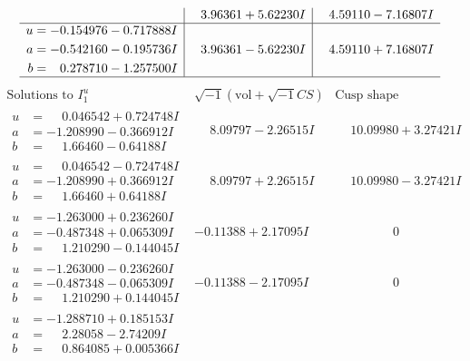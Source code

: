 \documentclass[1p]{elsarticle_modified}
\theoremstyle{definition}
\newcommand{\I}{\sqrt{-1}}
\begin{document}
$$\begin{array}{c|c|c}
 & \phantom{-}3.96361 + 5.62230 I & \phantom{-}4.59110 - 7.16807 I \\ \hline\begin{aligned}
u &= -0.154976 - 0.717888 I \\
a &= -0.542160 - 0.195736 I \\
b &= \phantom{-}0.278710 - 1.257500 I\end{aligned}
 & \phantom{-}3.96361 - 5.62230 I & \phantom{-}4.59110 + 7.16807 I\\
 \hline 
 \end{array}$$\newpage$$\begin{array}{c|c|c}  
\text{Solutions to }I^u_{1}& \I (\text{vol} + \sqrt{-1}CS) & \text{Cusp shape}\\
 \hline 
\begin{aligned}
u &= \phantom{-}0.046542 + 0.724748 I \\
a &= -1.208990 - 0.366912 I \\
b &= \phantom{-}1.66460 - 0.64188 I\end{aligned}
 & \phantom{-}8.09797 - 2.26515 I & \phantom{-}10.09980 + 3.27421 I \\ \hline\begin{aligned}
u &= \phantom{-}0.046542 - 0.724748 I \\
a &= -1.208990 + 0.366912 I \\
b &= \phantom{-}1.66460 + 0.64188 I\end{aligned}
 & \phantom{-}8.09797 + 2.26515 I & \phantom{-}10.09980 - 3.27421 I \\ \hline\begin{aligned}
u &= -1.263000 + 0.236260 I \\
a &= -0.487348 + 0.065309 I \\
b &= \phantom{-}1.210290 - 0.144045 I\end{aligned}
 & -0.11388 + 2.17095 I & \phantom{-0.000000 } 0 \\ \hline\begin{aligned}
u &= -1.263000 - 0.236260 I \\
a &= -0.487348 - 0.065309 I \\
b &= \phantom{-}1.210290 + 0.144045 I\end{aligned}
 & -0.11388 - 2.17095 I & \phantom{-0.000000 } 0 \\ \hline\begin{aligned}
u &= -1.288710 + 0.185153 I \\
a &= \phantom{-}2.28058 - 2.74209 I \\
b &= \phantom{-}0.864085 + 0.005366 I\end{aligned}

\end{array}$$
\end{document}
